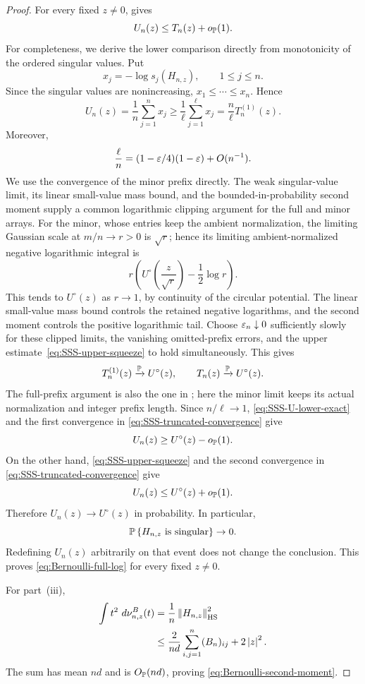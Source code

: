 \begin{proof}
For every fixed $z\ne0$, \cite[Lemma~8.2]{SSS25} gives
\begin{equation}\label{eq:SSS-upper-squeeze}
  U_n(z)\le T_n(z)+o_{\mathbb P}(1).
\end{equation}
For completeness, we derive the lower comparison directly from monotonicity of the ordered singular values. Put
\[
  x_j=-\log s_j(H_{n,z}),\qquad 1\le j\le n.
\]
Since the singular values are nonincreasing, $x_1\le\cdots\le x_n$. Hence
\begin{equation}\label{eq:SSS-U-lower-exact}
  U_n(z)=\frac1n\sum_{j=1}^n x_j
  \ge\frac1\ell\sum_{j=1}^{\ell}x_j
  =\frac n\ell T_n^{(1)}(z).
\end{equation}
Moreover,
\[
  \frac\ell n=(1-\varepsilon/4)(1-\varepsilon)+O(n^{-1}).
\]
We use the convergence of the minor prefix directly. The weak singular-value limit, its linear small-value mass bound, and the bounded-in-probability second moment supply a common logarithmic clipping argument for the full and minor arrays. For the minor, whose entries keep the ambient normalization, the limiting Gaussian scale at $m/n\to r>0$ is $\sqrt r$; hence its limiting ambient-normalized negative logarithmic integral is
\[
  r\left(U^\circ\left(\frac z{\sqrt r}\right)-\frac12\log r\right).
\]
This tends to $U^\circ(z)$ as $r\to1$, by continuity of the circular potential. The linear small-value mass bound controls the retained negative logarithms, and the second moment controls the positive logarithmic tail. Choose $\varepsilon_n\downarrow0$ sufficiently slowly for these clipped limits, the vanishing omitted-prefix errors, and the upper estimate~\eqref{eq:SSS-upper-squeeze} to hold simultaneously. This gives
\begin{equation}\label{eq:SSS-truncated-convergence}
  T_n^{(1)}(z)\xrightarrow{\mathbb P}U^\circ(z),
  \qquad
  T_n(z)\xrightarrow{\mathbb P}U^\circ(z).
\end{equation}
The full-prefix argument is also the one in \cite[Lemma~9.3]{SSS25}; here the minor limit keeps its actual normalization and integer prefix length. Since $n/\ell\to1$, \eqref{eq:SSS-U-lower-exact} and the first convergence in \eqref{eq:SSS-truncated-convergence} give
\[
  U_n(z)\ge U^\circ(z)-o_{\mathbb P}(1).
\]
On the other hand, \eqref{eq:SSS-upper-squeeze} and the second convergence in \eqref{eq:SSS-truncated-convergence} give
\[
  U_n(z)\le U^\circ(z)+o_{\mathbb P}(1).
\]
Therefore $U_n(z)\to U^\circ(z)$ in probability. In particular,
\[
  \mathbb P\left\{H_{n,z}\text{ is singular}\right\}\to0.
\]
Redefining $U_n(z)$ arbitrarily on that event does not change the conclusion. This proves \eqref{eq:Bernoulli-full-log} for every fixed $z\ne0$.

For part~(iii),
\begin{align*}
  \int t^2\,\,d\nu^B_{n,z}(t)
  &=\frac1n\left\|H_{n,z}\right\|_{\mathrm{HS}}^2\\
  &\le \frac{2}{nd}\sum_{i,j=1}^n(B_n)_{ij}+2\left|z\right|^2.
\end{align*}
The sum has mean $nd$ and is $O_{\mathbb P}(nd)$, proving \eqref{eq:Bernoulli-second-moment}.
\end{proof}

